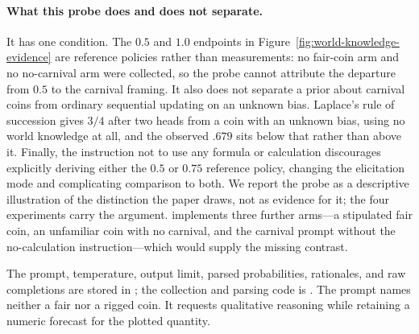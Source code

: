 \paragraph{What this probe does and does not separate.}
It has one condition. The $0.5$ and $1.0$ endpoints in
Figure~\ref{fig:world-knowledge-evidence} are reference policies rather than
measurements: no fair-coin arm and no no-carnival arm were collected, so the
probe cannot attribute the departure from $0.5$ to the carnival framing. It also
does not separate a prior about carnival coins from ordinary sequential updating
on an unknown bias. Laplace's rule of succession gives $3/4$ after two heads from
a coin with an unknown bias, using no world knowledge at all, and the observed
$.679$ sits below that rather than above it. Finally, the instruction not to use
any formula or calculation discourages explicitly deriving either the $0.5$ or
$0.75$ reference policy, changing the elicitation mode and complicating comparison
to both. We report the probe as a descriptive
illustration of the distinction the paper draws, not as evidence for it; the
four experiments carry the argument.  implements
three further arms---a stipulated fair coin, an unfamiliar coin with no carnival,
and the carnival prompt without the no-calculation instruction---which would
supply the missing contrast.

The prompt, temperature, output limit, parsed probabilities, rationales, and raw
completions are stored in
;
the collection and parsing code is
. The prompt names
neither a fair nor a rigged coin. It requests qualitative reasoning while retaining
a numeric forecast for the plotted quantity.
